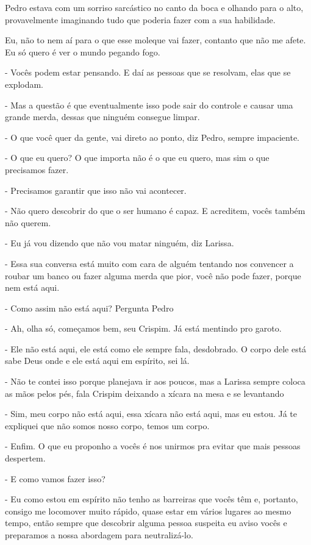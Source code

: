 Pedro estava com um sorriso sarcástico no canto da boca e olhando para o alto, provavelmente imaginando tudo que poderia fazer com a sua habilidade.

Eu, não to nem aí para o que esse moleque vai fazer, contanto que não me afete. Eu só quero é ver o mundo pegando fogo.

- Vocês podem estar pensando. E daí as pessoas que se resolvam, elas que se explodam.

- Mas a questão é que eventualmente isso pode sair do controle e causar uma grande merda, dessas que ninguém consegue limpar.

- O que você quer da gente, vai direto ao ponto, diz Pedro, sempre impaciente.

- O que eu quero? O que importa não é o que eu quero, mas sim o que precisamos fazer.

- Precisamos garantir que isso não vai acontecer.

- Não quero descobrir do que o ser humano é capaz. E acreditem, vocês também não querem.

- Eu já vou dizendo que não vou matar ninguém, diz Larissa.

- Essa sua conversa está muito com cara de alguém tentando nos convencer a roubar um banco ou fazer alguma merda que pior, você não pode fazer, porque nem está aqui.

- Como assim não está aqui? Pergunta Pedro

- Ah, olha só, começamos bem, seu Crispim. Já está mentindo pro garoto.

- Ele não está aqui, ele está como ele sempre fala, desdobrado. O corpo dele está sabe Deus onde e ele está aqui em espírito, sei lá.

- Não te contei isso porque planejava ir aos poucos, mas a Larissa sempre coloca as mãos pelos pés, fala Crispim deixando a xícara na mesa e se levantando

- Sim, meu corpo não está aqui, essa xícara não está aqui, mas eu estou. Já te expliquei que não somos nosso corpo, temos um corpo.

- Enfim. O que eu proponho a vocês é nos unirmos pra evitar que mais pessoas despertem.

- E como vamos fazer isso?

- Eu como estou em espírito não tenho as barreiras que vocês têm e, portanto, consigo me locomover muito rápido, quase estar em vários lugares ao mesmo tempo, então sempre que descobrir alguma pessoa suspeita eu aviso vocês e preparamos a nossa abordagem para neutralizá-lo.


